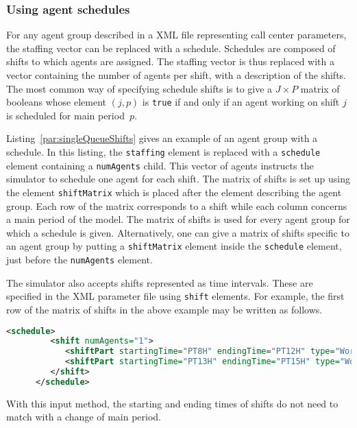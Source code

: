 \subsubsection{Using agent schedules}
\label{sec:mskSchedules}

For any agent group described in a XML file representing call center
parameters, the staffing vector can be replaced with a schedule.
Schedules are composed of shifts to which
agents are assigned. The staffing vector is thus replaced with a vector
containing the number of agents per shift, with a description of the shifts.
The most common way of specifying schedule shifts is to give a
$J\times P$
matrix of booleans whose element $(j, p)$ is \texttt{true} if and only if
an agent working on shift $j$ is scheduled for main period~$p$.

Listing~\ref{par:singleQueueShifts} gives an example of an agent group
with a schedule. In this listing, the \texttt{staffing} element is
replaced with a \texttt{schedule} element containing a
\texttt{numAgents} child. This vector of agents instructs the simulator to
schedule one agent for each shift.
The matrix of shifts is set up using the element \texttt{shift\-Matrix}
which is placed after the element describing the agent group. Each row
of the matrix corresponds to a shift while each column concerns a main
period of the model.
The matrix of shifts is used for every agent group for which a schedule is
given.  Alternatively, one can give a matrix of shifts specific to an
agent group by putting a \texttt{shift\-Matrix} element inside the
\texttt{schedule} element, just before the \texttt{num\-Agents} element.



The simulator also accepts shifts represented as time
intervals. These are specified in the XML parameter file using
\texttt{shift} elements. For example, the first row of the
matrix of shifts in the above example may be written as follows.
\begin{lstlisting}[language=XML]
      <schedule>
         <shift numAgents="1">
            <shiftPart startingTime="PT8H" endingTime="PT12H" type="Working"/>
            <shiftPart startingTime="PT13H" endingTime="PT15H" type="Working"/>
         </shift>
      </schedule>
\end{lstlisting}
With this input method, the starting and ending times of shifts do not
need to match with a change of main period.

